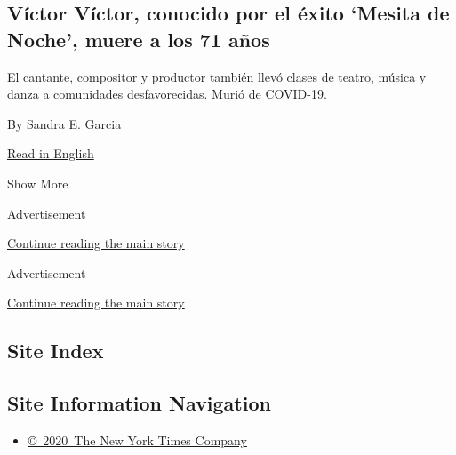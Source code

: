 \begin{enumerate}
{  \subsection{Víctor Víctor, conocido por el éxito `Mesita de Noche',
  muere a los 71
  años}\label{vuxedctor-vuxedctor-conocido-por-el-uxe9xito-mesita-de-noche-muere-a-los-71-auxf1os}}

  El cantante, compositor y productor también llevó clases de teatro,
  música y danza a comunidades desfavorecidas. Murió de COVID-19.

  By Sandra E. Garcia

  \href{https://www.nytimes.com/2020/08/01/obituaries/victor-victor-dead-coronavirus.html}{Read
  in English}
\end{enumerate}

Show More

Advertisement

\protect\hyperlink{after-mid1}{Continue reading the main story}

Advertisement

\protect\hyperlink{after-mktg}{Continue reading the main story}

\hypertarget{site-index}{%
\subsection{Site Index}\label{site-index}}

\hypertarget{site-information-navigation}{%
\subsection{Site Information
Navigation}\label{site-information-navigation}}

\begin{itemize}
\tightlist
\item
  \href{https://help.nytimes.com/hc/en-us/articles/115014792127-Copyright-notice}{©~2020~The
  New York Times Company}
\end{itemize}

